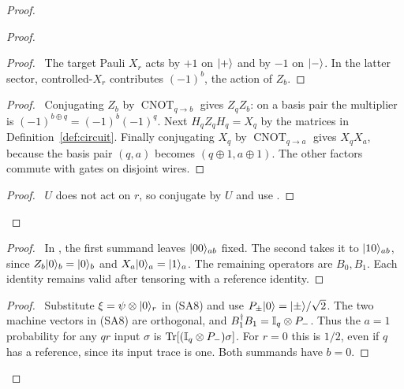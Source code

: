 \begin{proof}
 \begin{proof}
  \begin{proof}\pf\ The target Pauli $X_r$ acts by $+1$ on
  $\lvert +\rangle$ and by $-1$ on $\lvert -\rangle$. In the latter sector,
  controlled-$X_r$ contributes $(-1)^b$, the action of $Z_b$.
  \end{proof}
  \begin{proof}\pf\ Conjugating $Z_b$ by
  $\operatorname{CNOT}_{q\to b}$ gives $Z_qZ_b$: on a basis
  pair the multiplier is $(-1)^{b\oplus q}=(-1)^b(-1)^q$.
  Next $H_qZ_qH_q=X_q$ by the matrices in
  Definition~\ref{def:circuit}. Finally conjugating $X_q$ by
  $\operatorname{CNOT}_{q\to a}$ gives $X_qX_a$, because
  the basis pair $(q,a)$ becomes $(q\oplus1,a\oplus1)$.
  The other factors commute with gates on disjoint wires.
  \end{proof}
  \qedstep
  \begin{proof}\pf\ $U$ does not act on $r$, so conjugate
   by $U$ and use .
  \end{proof}
 \end{proof}
 \begin{proof}\pf\ In , the first
 summand leaves $\lvert 00\rangle_{ab}$ fixed. The second takes it to
 $\lvert 10\rangle_{ab}$, since $Z_b\lvert 0\rangle_b=\lvert 0\rangle_b$ and
 $X_a\lvert 0\rangle_a=\lvert 1\rangle_a$. The remaining operators are $B_0,B_1$.
 Each identity remains valid after tensoring with a reference identity.
 \end{proof}
 \begin{proof}\pf\ Substitute $\xi=\psi\otimes\lvert 0\rangle_r$ in
 (SA8) and use $P_\pm\lvert 0\rangle=\lvert \pm\rangle/\sqrt2$.
 The two machine vectors in (SA8) are orthogonal, and
 $B_1^\dagger B_1=\mathbb{I}_q\otimes P_-$. Thus the $a=1$
 probability for any $qr$ input $\sigma$ is
 $\operatorname{Tr}[(\mathbb{I}_q\otimes P_-)\sigma]$. For $r=0$ this is $1/2$,
 even if $q$ has a reference, since its input trace is one.
 Both summands have $b=0$.
 \end{proof}

\end{proof}
